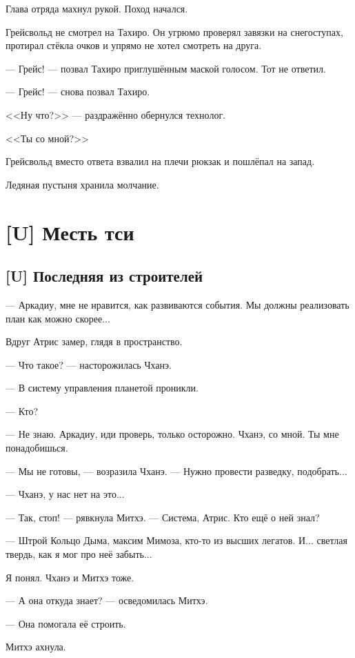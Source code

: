 Глава отряда махнул рукой.
Поход начался.

Грейсвольд не смотрел на Тахиро.
Он угрюмо проверял завязки на снегоступах, протирал стёкла очков и упрямо не хотел смотреть на друга.

--- Грейс! --- позвал Тахиро приглушённым маской голосом.
Тот не ответил.

--- Грейс! --- снова позвал Тахиро.

<<Ну что?>> --- раздражённо обернулся технолог.

<<Ты со мной?>>

Грейсвольд вместо ответа взвалил на плечи рюкзак и пошлёпал на запад.

Ледяная пустыня хранила молчание.

\chapter{[U] Месть тси}

\section{[U] Последняя из строителей}

\textspace

--- Аркадиу, мне не нравится, как развиваются события.
Мы должны реализовать план как можно скорее...

Вдруг Атрис замер, глядя в пространство.

--- Что такое? --- насторожилась Чханэ.

--- В систему управления планетой проникли.

--- Кто?

--- Не знаю.
Аркадиу, иди проверь, только осторожно.
Чханэ, со мной.
Ты мне понадобишься.

--- Мы не готовы, --- возразила Чханэ.
--- Нужно провести разведку, подобрать...

--- Чханэ, у нас нет на это...

--- Так, стоп! --- рявкнула Митхэ.
--- Система, Атрис.
Кто ещё о ней знал?

--- Штрой Кольцо Дыма, максим Мимоза, кто-то из высших легатов.
И... светлая твердь, как я мог про неё забыть...

Я понял.
Чханэ и Митхэ тоже.

--- А она откуда знает? --- осведомилась Митхэ.

--- Она помогала её строить.

Митхэ ахнула.

